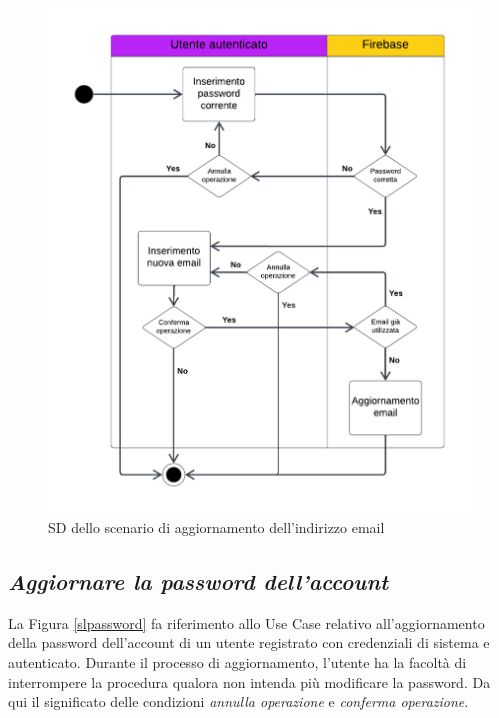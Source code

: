 \documentclass[11pt, a4paper]{article}
\theoremstyle{definition} %
\begin{document}
\begin{figure}[H]
\centering
\hspace*{-1cm}
\includegraphics[scale = 0.85]{materiale/ucdiagrams/swimlaneemail.pdf}
\caption{SD dello scenario di aggiornamento dell'indirizzo email}
\label{slemail}
\end{figure}

\subsection*{\textit{Aggiornare la password dell'account}}
La Figura \ref{slpassword} fa riferimento allo Use Case relativo all'aggiornamento
della password dell'account di un utente registrato con credenziali di sistema e autenticato.
Durante il processo di aggiornamento, l'utente ha la facoltà di interrompere
la procedura qualora non intenda più modificare la password. Da qui il
significato delle condizioni \textit{annulla operazione} e \textit{conferma
operazione}.
\end{document}
